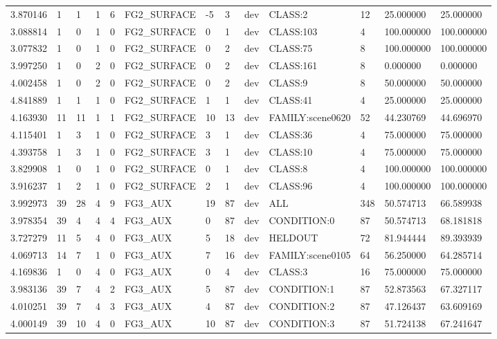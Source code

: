 \begin{tabular}{lllllllllllll}
3.870146 & 1 & 1 & 1 & 6 & FG2\_SURFACE & -5 & 3 & dev & CLASS:2 & 12 & 25.000000 & 25.000000 \\
3.088814 & 1 & 0 & 1 & 0 & FG2\_SURFACE & 0 & 1 & dev & CLASS:103 & 4 & 100.000000 & 100.000000 \\
3.077832 & 1 & 0 & 1 & 0 & FG2\_SURFACE & 0 & 2 & dev & CLASS:75 & 8 & 100.000000 & 100.000000 \\
3.997250 & 1 & 0 & 2 & 0 & FG2\_SURFACE & 0 & 2 & dev & CLASS:161 & 8 & 0.000000 & 0.000000 \\
4.002458 & 1 & 0 & 2 & 0 & FG2\_SURFACE & 0 & 2 & dev & CLASS:9 & 8 & 50.000000 & 50.000000 \\
4.841889 & 1 & 1 & 1 & 0 & FG2\_SURFACE & 1 & 1 & dev & CLASS:41 & 4 & 25.000000 & 25.000000 \\
4.163930 & 11 & 11 & 1 & 1 & FG2\_SURFACE & 10 & 13 & dev & FAMILY:scene0620 & 52 & 44.230769 & 44.696970 \\
4.115401 & 1 & 3 & 1 & 0 & FG2\_SURFACE & 3 & 1 & dev & CLASS:36 & 4 & 75.000000 & 75.000000 \\
4.393758 & 1 & 3 & 1 & 0 & FG2\_SURFACE & 3 & 1 & dev & CLASS:10 & 4 & 75.000000 & 75.000000 \\
3.829908 & 1 & 0 & 1 & 0 & FG2\_SURFACE & 0 & 1 & dev & CLASS:8 & 4 & 100.000000 & 100.000000 \\
3.916237 & 1 & 2 & 1 & 0 & FG2\_SURFACE & 2 & 1 & dev & CLASS:96 & 4 & 100.000000 & 100.000000 \\
3.992973 & 39 & 28 & 4 & 9 & FG3\_AUX & 19 & 87 & dev & ALL & 348 & 50.574713 & 66.589938 \\
3.978354 & 39 & 4 & 4 & 4 & FG3\_AUX & 0 & 87 & dev & CONDITION:0 & 87 & 50.574713 & 68.181818 \\
3.727279 & 11 & 5 & 4 & 0 & FG3\_AUX & 5 & 18 & dev & HELDOUT & 72 & 81.944444 & 89.393939 \\
4.069713 & 14 & 7 & 1 & 0 & FG3\_AUX & 7 & 16 & dev & FAMILY:scene0105 & 64 & 56.250000 & 64.285714 \\
4.169836 & 1 & 0 & 4 & 0 & FG3\_AUX & 0 & 4 & dev & CLASS:3 & 16 & 75.000000 & 75.000000 \\
3.983136 & 39 & 7 & 4 & 2 & FG3\_AUX & 5 & 87 & dev & CONDITION:1 & 87 & 52.873563 & 67.327117 \\
4.010251 & 39 & 7 & 4 & 3 & FG3\_AUX & 4 & 87 & dev & CONDITION:2 & 87 & 47.126437 & 63.609169 \\
4.000149 & 39 & 10 & 4 & 0 & FG3\_AUX & 10 & 87 & dev & CONDITION:3 & 87 & 51.724138 & 67.241647 \\

\end{tabular}
